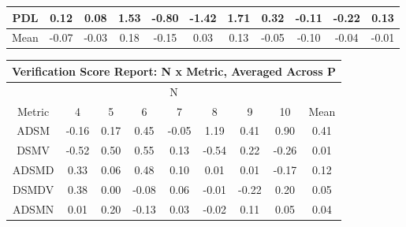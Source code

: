 \begin{longtable}{ | c || c | c | c | c | c | c | c | c | c || c |}
PDL &  \cellcolor[HTML]{FFFFFF} 0.12 &  \cellcolor[HTML]{FFFFFF} 0.08 &  \cellcolor[HTML]{D7D7FF} 1.53 &  \cellcolor[HTML]{FFE7E7} -0.80 &  \cellcolor[HTML]{FFDFDF} -1.42 &  \cellcolor[HTML]{D7D7FF} 1.71 &  \cellcolor[HTML]{F7F7FF} 0.32 &  \cellcolor[HTML]{FFFFFF} -0.11 &  \cellcolor[HTML]{FFF7F7} -0.22 &  \cellcolor[HTML]{FFFFFF} 0.13 \\
\hline
\hline
Mean  &  \cellcolor[HTML]{FFFFFF} -0.07 &  \cellcolor[HTML]{FFFFFF} -0.03 &  \cellcolor[HTML]{F7F7FF} 0.18 &  \cellcolor[HTML]{FFFFFF} -0.15 &  \cellcolor[HTML]{FFFFFF} 0.03 &  \cellcolor[HTML]{FFFFFF} 0.13 &  \cellcolor[HTML]{FFFFFF} -0.05 &  \cellcolor[HTML]{FFFFFF} -0.10 &  \cellcolor[HTML]{FFFFFF} -0.04 &  \cellcolor[HTML]{FFFFFF} -0.01 \\
\hline
\end{longtable}
\begin{longtable}{ | c || c | c | c | c | c | c | c || c |}
\hline
\multicolumn{9}{|c|}{ Verification Score Report: N x Metric, Averaged Across P } \\
\hline
\multicolumn{9}{|c|}{ N } \\
\hline
Metric & 4 & 5 & 6 & 7 & 8 & 9 & 10 & Mean\\
\hline
\hline
\endhead
ADSM &  \cellcolor[HTML]{FFF7F7} -0.16 &  \cellcolor[HTML]{F7F7FF} 0.17 &  \cellcolor[HTML]{F7F7FF} 0.45 &  \cellcolor[HTML]{FFFFFF} -0.05 &  \cellcolor[HTML]{DFDFFF} 1.19 &  \cellcolor[HTML]{F7F7FF} 0.41 &  \cellcolor[HTML]{E7E7FF} 0.90 &  \cellcolor[HTML]{F7F7FF} 0.41 \\
DSMV &  \cellcolor[HTML]{FFEFEF} -0.52 &  \cellcolor[HTML]{EFEFFF} 0.50 &  \cellcolor[HTML]{EFEFFF} 0.55 &  \cellcolor[HTML]{FFFFFF} 0.13 &  \cellcolor[HTML]{FFEFEF} -0.54 &  \cellcolor[HTML]{F7F7FF} 0.22 &  \cellcolor[HTML]{FFF7F7} -0.26 &  \cellcolor[HTML]{FFFFFF} 0.01 \\
ADSMD &  \cellcolor[HTML]{F7F7FF} 0.33 &  \cellcolor[HTML]{FFFFFF} 0.06 &  \cellcolor[HTML]{EFEFFF} 0.48 &  \cellcolor[HTML]{FFFFFF} 0.10 &  \cellcolor[HTML]{FFFFFF} 0.01 &  \cellcolor[HTML]{FFFFFF} 0.01 &  \cellcolor[HTML]{FFF7F7} -0.17 &  \cellcolor[HTML]{FFFFFF} 0.12 \\
DSMDV &  \cellcolor[HTML]{F7F7FF} 0.38 &  \cellcolor[HTML]{FFFFFF} 0.00 &  \cellcolor[HTML]{FFFFFF} -0.08 &  \cellcolor[HTML]{FFFFFF} 0.06 &  \cellcolor[HTML]{FFFFFF} -0.01 &  \cellcolor[HTML]{FFF7F7} -0.22 &  \cellcolor[HTML]{F7F7FF} 0.20 &  \cellcolor[HTML]{FFFFFF} 0.05 \\
ADSMN &  \cellcolor[HTML]{FFFFFF} 0.01 &  \cellcolor[HTML]{F7F7FF} 0.20 &  \cellcolor[HTML]{FFFFFF} -0.13 &  \cellcolor[HTML]{FFFFFF} 0.03 &  \cellcolor[HTML]{FFFFFF} -0.02 &  \cellcolor[HTML]{FFFFFF} 0.11 &  \cellcolor[HTML]{FFFFFF} 0.05 &  \cellcolor[HTML]{FFFFFF} 0.04 \\

\end{longtable}
